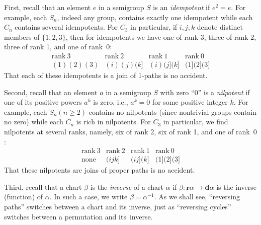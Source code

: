 \documentclass{surv-l}
\numberwithin{equation}{section}
\numberwithin{table}{section}
\numberwithin{figure}{section}
\theoremstyle{plain}
\theoremstyle{definition}
\begin{document}
First, recall that an element $e$ in a semigroup $S$ is an
\emph{idempotent} if $e^{2}=e$. For example,
each $S_{n}$, indeed any group, contains exactly one idempotent
while each $C_{n}$ contains several idempotents. For $C_{3}$ in
particular, if $i,j,k$ denote distinct members of $\{1, 2, 3\}$,
then for idempotents we have one of rank 3, three of rank 2, three
of rank 1, and one of rank~$0$:
\[
\begin{matrix}
\mathrm{rank}\ 3 &\mathrm{rank}\ 2 &\mathrm{rank}\ 1 &\mathrm{rank}\ 0 \\
(1)(2)(3) &(i)(j)(k] &(i)(j](k] &(1](2](3]
\end{matrix}
\]
That each of these idempotents is a join of 1-paths is no
accident.

Second, recall that an element $a$ in a semigroup $S$ with zero
``$0$'' is a \emph{nilpotent} if one of its
positive powers $a^{k}$ is zero, i.e., $a^{k}=0$ for some positive
integer $k$. For example, each $S_{n} (n\geq 2)$ contains no
nilpotents (since nontrivial groups contain no zero) while each
$C_{n}$ is rich in nilpotents. For $C_{3}$ in particular, we find
nilpotents at several ranks, namely, six of rank 2, six of rank 1,
and one of rank~$0$:
\[
\begin{matrix}
\mathrm{rank}\ 3 &\mathrm{rank}\ 2 &\mathrm{rank}\ 1 &\mathrm{rank}\ 0 \\
\mathrm{none} &(ijk] &(ij](k] &(1](2](3]
\end{matrix}
\]
That these nilpotents are joins of proper paths is no accident.

Third, recall that a chart $\beta$ is the \emph{inverse} of a
chart $\alpha$ if $\beta : \mathbf{r}\alpha\rightarrow
\mathbf{d}\alpha$ is the inverse (function) of $\alpha$. In such a
case, we write $\beta=\alpha^{-1}$. As we shall see, ``reversing
paths'' switches between a chart and its inverse, just as
``reversing cycles'' switches between a permutation and
its~inverse.
\end{document}
